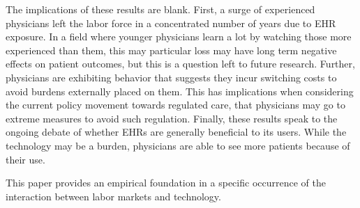 \documentclass[11pt]{article}
\begin{document}
The implications of these results are blank. First, a surge of experienced physicians left the labor force in a concentrated number of years due to EHR exposure. In a field where younger physicians learn a lot by watching those more experienced than them, this may particular loss may have long term negative effects on patient outcomes, but this is a question left to future research. Further, physicians are exhibiting behavior that suggests they incur switching costs to avoid burdens externally placed on them. This has implications when considering the current policy movement towards regulated care, that physicians may go to extreme measures to avoid such regulation. Finally, these results speak to the ongoing debate of whether EHRs are generally beneficial to its users. While the technology may be a burden, physicians are able to see more patients because of their use. 

This paper provides an empirical foundation in a specific occurrence of the interaction between labor markets and technology.




\renewcommand*{\bibfont}{\footnotesize}

\printbibliography

\newpage

\appendix

\section{}
\end{document}

